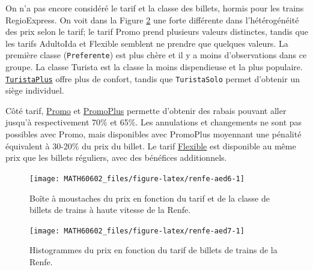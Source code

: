 \documentclass[
  11pt,
  letterpaper,
]{book}
\theoremstyle{definition}
\theoremstyle{definition}
\theoremstyle{definition}
\theoremstyle{remark}
\begin{document}
On n'a pas encore considéré le tarif et la classe des billets, hormis pour les trains RegioExpress. On voit dans la Figure \ref{fig:renfe-aed7} une forte différente dans l'hétérogénéité des prix selon le tarif; le tarif Promo prend plusieurs valeurs distinctes, tandis que les tarifs AdultoIda et Flexible semblent ne prendre que quelques valeurs. La première classe (\texttt{Preferente}) est plus chère et il y a moins d'observations dans ce groupe. La classe Turista est la classe la moins dispendieuse et la plus populaire. \href{http://web.archive.org/web/20161111134241/http://www.renfe.com/viajeros/tarifas/billete_promo.html}{\texttt{TuristaPlus}} offre plus de confort, tandis que \texttt{TuristaSolo} permet d'obtenir un siège individuel.

Côté tarif, \href{http://web.archive.org/web/20161111134241/http://www.renfe.com/viajeros/tarifas/billete_promo.html}{Promo} et \href{http://web.archive.org/web/20161110220249/http://www.renfe.com/viajeros/tarifas/billete_promoplus.html}{PromoPlus} permette d'obtenir des rabais pouvant aller jusqu'à respectivement 70\% et 65\%. Les annulations et changements ne sont pas possibles avec Promo, mais disponibles avec PromoPlus moyennant une pénalité équivalent à 30-20\% du prix du billet. Le tarif \href{http://web.archive.org/web/20161108192609/http://www.renfe.com/viajeros/tarifas/billete_flexible.html}{Flexible} est disponible au même prix que les billets réguliers, avec des bénéfices additionnels.

\begin{figure}

{\centering \texttt{[image: MATH60602\_files/figure-latex/renfe-aed6-1]} 

}

\caption{Boîte à moustaches du prix en fonction du tarif et de la classe de billets de trains à haute vitesse de la Renfe.}\label{fig:renfe-aed6}
\end{figure}

\begin{figure}

{\centering \texttt{[image: MATH60602\_files/figure-latex/renfe-aed7-1]} 

}

\caption{Histogrammes du prix en fonction du tarif de billets de trains de la Renfe.}\label{fig:renfe-aed7}
\end{figure}
\end{document}
